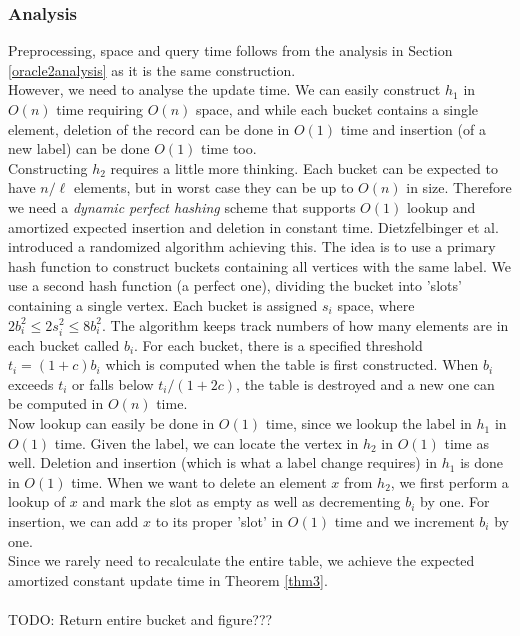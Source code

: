 \subsubsection{Analysis}
Preprocessing, space and query time follows from the analysis in Section
\ref{oracle2analysis} as it is the same construction. \\
However, we need to analyse the update time. We can easily construct $h_1$ in $O(n)$ time
requiring $O(n)$ space, and while each bucket contains a single element, deletion of the record  can be done in $O(1)$ time and insertion (of a new label) can be done $O(1)$ time too. \\
Constructing $h_2$ requires a little more thinking. Each bucket can be expected to
have $n/\ell$ elements, but in worst case they can be up to $O(n)$ in size. Therefore we
need a \textit{dynamic perfect hashing} scheme that supports $O(1)$ lookup and
amortized expected insertion and deletion in constant time. Dietzfelbinger et al.
\cite{dietzfelbinger1994dynamic} introduced a randomized algorithm achieving this. The idea is to use a
primary hash function to construct buckets containing all vertices with the same label.
We use a second hash function (a perfect one), dividing the bucket into 'slots'
containing a single vertex. Each bucket is assigned $s_i$ space, where $2b_i^2\leq
2s_i^2\leq 8b_i^2$. The algorithm keeps track numbers of how many elements are in each bucket
called $b_i$. For each bucket, there is a specified threshold $t_i=(1+c)b_i$ which is
computed when the table is first constructed. When $b_i$ exceeds $t_i$ or falls below
$t_i/(1+2c)$, the table is destroyed and a new one can be computed in $O(n)$ time. \\
Now lookup can easily be done in $O(1)$ time, since we lookup the label in $h_1$ in
$O(1)$ time. Given the label, we can locate the vertex in $h_2$ in $O(1)$ time as well.
Deletion and insertion (which is what a label change requires) in $h_1$ is done in $O(1)$
time. When we want to delete an element $x$ from $h_2$, we first perform a lookup of $x$
and mark the slot as empty as well as decrementing $b_i$ by one. For insertion, we can
add $x$ to its proper 'slot' in $O(1)$ time and we increment $b_i$ by one. \\
Since we rarely need to recalculate the entire table, we achieve the expected amortized
constant update time in Theorem \ref{thm3}. \\
\\
TODO: Return entire bucket and figure???
